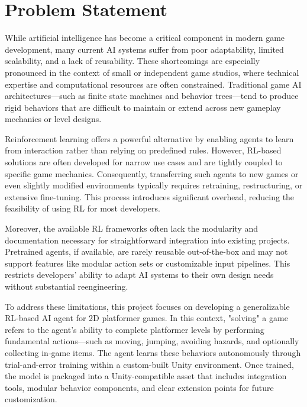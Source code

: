 \documentclass[12pt,oneside,openright,a4paper]{cpe-english-project}
\begin{document}
\section{Problem Statement}

While artificial intelligence has become a critical component in modern game development, many current AI systems suffer from poor adaptability, limited scalability, and a lack of reusability. These shortcomings are especially pronounced in the context of small or independent game studios, where technical expertise and computational resources are often constrained. Traditional game AI architectures—such as finite state machines and behavior trees—tend to produce rigid behaviors that are difficult to maintain or extend across new gameplay mechanics or level designs.\par

Reinforcement learning offers a powerful alternative by enabling agents to learn from interaction rather than relying on predefined rules. However, RL-based solutions are often developed for narrow use cases and are tightly coupled to specific game mechanics. Consequently, transferring such agents to new games or even slightly modified environments typically requires retraining, restructuring, or extensive fine-tuning. This process introduces significant overhead, reducing the feasibility of using RL for most developers.\par

Moreover, the available RL frameworks often lack the modularity and documentation necessary for straightforward integration into existing projects. Pretrained agents, if available, are rarely reusable out-of-the-box and may not support features like modular action sets or customizable input pipelines. This restricts developers’ ability to adapt AI systems to their own design needs without substantial reengineering.\par

To address these limitations, this project focuses on developing a generalizable RL-based AI agent for 2D platformer games. In this context, "solving" a game refers to the agent’s ability to complete platformer levels by performing fundamental actions—such as moving, jumping, avoiding hazards, and optionally collecting in-game items. The agent learns these behaviors autonomously through trial-and-error training within a custom-built Unity environment. Once trained, the model is packaged into a Unity-compatible asset that includes integration tools, modular behavior components, and clear extension points for future customization.\par
\end{document}
